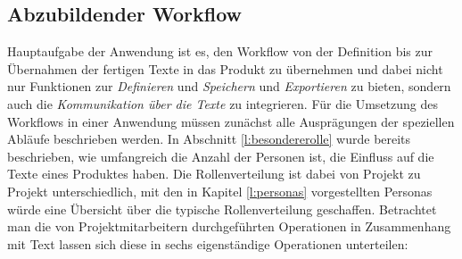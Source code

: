 \subsection{Abzubildender Workflow}\label{l:workflow}

Hauptaufgabe der Anwendung ist es, den Workflow von der Definition bis zur Übernahmen der fertigen Texte in das Produkt zu übernehmen und dabei nicht nur Funktionen zur \emph{Definieren} und \emph{Speichern} und \emph{Exportieren} zu bieten, sondern auch die \emph{Kommunikation über die Texte} zu integrieren. Für die Umsetzung des Workflows in einer Anwendung müssen zunächst alle Ausprägungen der speziellen Abläufe beschrieben werden. In Abschnitt \ref{l:besondererolle} wurde bereits beschrieben, wie umfangreich die Anzahl der Personen ist, die Einfluss auf die Texte eines Produktes haben. Die Rollenverteilung ist dabei von Projekt zu Projekt unterschiedlich, mit den in Kapitel \ref{l:personas} vorgestellten Personas würde eine Übersicht über die typische Rollenverteilung geschaffen. Betrachtet man die von Projektmitarbeitern durchgeführten Operationen in Zusammenhang mit Text lassen sich diese in sechs eigenständige Operationen unterteilen:

